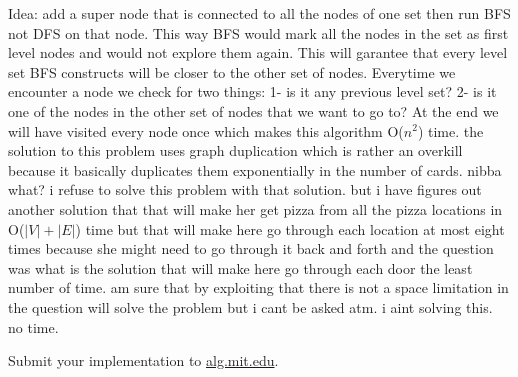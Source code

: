 \documentclass[12pt,twoside]{article}
\begin{document}
\begin{problems}
Idea: add a super node that is connected to all the nodes of one set then run BFS not DFS on that node. This way BFS would mark all the nodes in the set as first level nodes and would not explore them again. This will garantee that every level set BFS constructs will be closer to the other set of nodes. Everytime we encounter a node we check for two things: 
1- is it any previous level set?
2- is it one of the nodes in the other set of nodes that we want to go to? 
At the end we will have visited every node once which makes this algorithm O($n^2$) time.
\newpage
\problem  %
the solution to this problem uses graph duplication which is rather an overkill because it basically duplicates them exponentially in the number of cards. nibba what? i refuse to solve this problem with that solution. but i have figures out another solution that that will make her get pizza from all the pizza locations in O($|V| + |E|$) time but that will make here go through each location at most eight times because she might need to go through it back and forth and the question was what is the solution that will make here go through each door the least number of time. am sure that by exploiting that there is not a space limitation in the question will solve the problem but i cant be asked atm.
\newpage
\problem  %
i aint solving this. no time.
\begin{problemparts}
\problempart %
\problempart %
\problempart %
\problempart Submit your implementation to {\small\url{alg.mit.edu}}.
\end{problemparts}

\end{problems}
\end{document}
